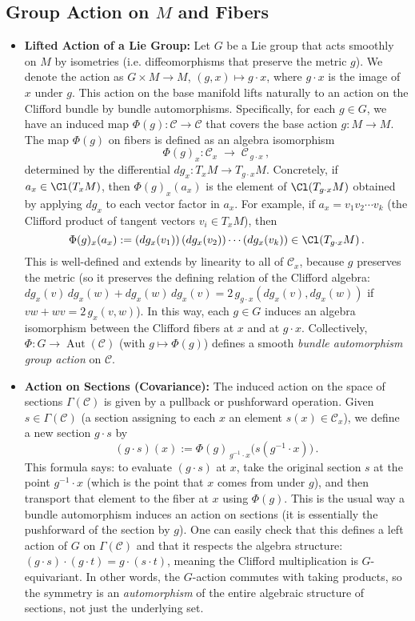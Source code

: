 \documentclass[12pt]{article}
\begin{document}
\subsection{Group Action on $M$ and Fibers}
\begin{itemize}
    \item \textbf{Lifted Action of a Lie Group:} Let $G$ be a Lie group that acts smoothly on $M$ by isometries (i.e. diffeomorphisms that preserve the metric $g$). We denote the action as $G \times M \to M$, $(g, x) \mapsto g\cdot x$, where $g\cdot x$ is the image of $x$ under $g$. This action on the base manifold lifts naturally to an action on the Clifford bundle by bundle automorphisms. Specifically, for each $g \in G$, we have an induced map $\Phi(g): \mathcal{C} \to \mathcal{C}$ that covers the base action $g: M \to M$. The map $\Phi(g)$ on fibers is defined as an algebra isomorphism 
    \[
       \Phi(g)_x : \mathcal{C}_x \;\to\; \mathcal{C}_{\,g\cdot x}\,,
    \] 
    determined by the differential $dg_x: T_x M \to T_{g\cdot x}M$.  Concretely, if $a_x \in \Cl(T_xM)$, then $\Phi(g)_x(a_x)$ is the element of $\Cl(T_{g\cdot x}M)$ obtained by applying $dg_x$ to each vector factor in $a_x$. For example, if $a_x = v_1 v_2 \cdots v_k$ (the Clifford product of tangent vectors $v_i \in T_xM$), then 
    \[
       \Phi(g)_x(a_x) := (dg_x(v_1))\, (dg_x(v_2)) \cdots (dg_x(v_k)) \in \Cl(T_{g\cdot x}M)\,. 
    \] 
    This is well-defined and extends by linearity to all of $\mathcal{C}_x$, because $g$ preserves the metric (so it preserves the defining relation of the Clifford algebra: $dg_x(v)\,dg_x(w)+dg_x(w)\,dg_x(v) = 2\,g_{g\cdot x}(dg_x(v), dg_x(w))$ if $v w + w v = 2\,g_x(v,w)$). In this way, each $g\in G$ induces an algebra isomorphism between the Clifford fibers at $x$ and at $g\cdot x$. Collectively, $\Phi: G \to \operatorname{Aut}(\mathcal{C})$ (with $g \mapsto \Phi(g)$) defines a smooth \emph{bundle automorphism group action} on $\mathcal{C}$.

    \item \textbf{Action on Sections (Covariance):} The induced action on the space of sections $\Gamma(\mathcal{C})$ is given by a pullback or pushforward operation. Given $s \in \Gamma(\mathcal{C})$ (a section assigning to each $x$ an element $s(x) \in \mathcal{C}_x$), we define a new section $g \cdot s$ by 
    \[
        (g\cdot s)(x) := \Phi(g)_{\,g^{-1}\cdot x}\big(s(g^{-1}\cdot x)\big)\,.
    \] 
    This formula says: to evaluate $(g\cdot s)$ at $x$, take the original section $s$ at the point $g^{-1}\cdot x$ (which is the point that $x$ comes from under $g$), and then transport that element to the fiber at $x$ using $\Phi(g)$. This is the usual way a bundle automorphism induces an action on sections (it is essentially the pushforward of the section by $g$). One can easily check that this defines a left action of $G$ on $\Gamma(\mathcal{C})$ and that it respects the algebra structure: $(g\cdot s) \cdot (g \cdot t) = g \cdot (s \cdot t)$, meaning the Clifford multiplication is $G$-equivariant. In other words, the $G$-action commutes with taking products, so the symmetry is an \emph{automorphism} of the entire algebraic structure of sections, not just the underlying set.


\end{itemize}
\end{document}
